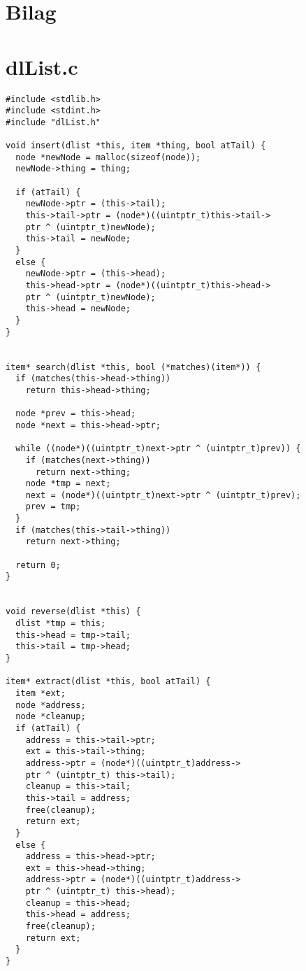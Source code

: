 \documentclass[a4paper,12pt]{article}
\begin{document}
\section*{Bilag}

\section*{dlList.c}
\begin{lstlisting}
#include <stdlib.h>
#include <stdint.h>
#include "dlList.h"

void insert(dlist *this, item *thing, bool atTail) {
  node *newNode = malloc(sizeof(node));
  newNode->thing = thing;

  if (atTail) {
    newNode->ptr = (this->tail);
    this->tail->ptr = (node*)((uintptr_t)this->tail->
    ptr ^ (uintptr_t)newNode);
    this->tail = newNode;
  }
  else {
    newNode->ptr = (this->head);
    this->head->ptr = (node*)((uintptr_t)this->head->
    ptr ^ (uintptr_t)newNode);
    this->head = newNode;
  }
}


item* search(dlist *this, bool (*matches)(item*)) {
  if (matches(this->head->thing))
    return this->head->thing;

  node *prev = this->head;
  node *next = this->head->ptr;

  while ((node*)((uintptr_t)next->ptr ^ (uintptr_t)prev)) {
    if (matches(next->thing))
      return next->thing;
    node *tmp = next;
    next = (node*)((uintptr_t)next->ptr ^ (uintptr_t)prev);
    prev = tmp;
  }
  if (matches(this->tail->thing))
    return next->thing;

  return 0;
}


void reverse(dlist *this) {
  dlist *tmp = this;
  this->head = tmp->tail;
  this->tail = tmp->head;
}

item* extract(dlist *this, bool atTail) {
  item *ext;
  node *address;
  node *cleanup;
  if (atTail) {
    address = this->tail->ptr;
    ext = this->tail->thing;
    address->ptr = (node*)((uintptr_t)address->
    ptr ^ (uintptr_t) this->tail);
    cleanup = this->tail;
    this->tail = address;
    free(cleanup);
    return ext;
  }
  else {
    address = this->head->ptr;
    ext = this->head->thing;
    address->ptr = (node*)((uintptr_t)address->
    ptr ^ (uintptr_t) this->head);
    cleanup = this->head;
    this->head = address;
    free(cleanup);
    return ext;
  }
}
\end{lstlisting}
\newpage
\end{document}
